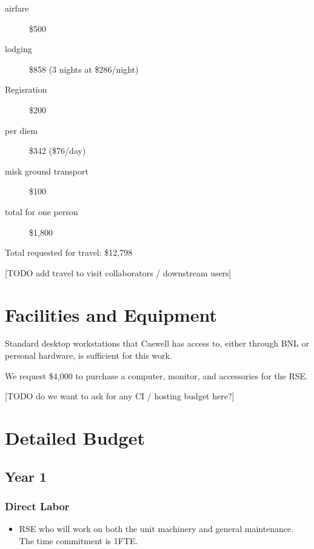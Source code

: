 \documentclass[12pt]{article}
\numberwithin{page}{section}
\begin{document}
\begin{description}
\item [airfare] \$500
\item [lodging] \$858 (3 nights at \$286/night)
\item [Regisration] \$200
\item [per diem] \$342 (\$76/day)
\item [misk ground transport] \$100
\item [total for one person] \$1,800
\end{description}


Total requested for travel: \$12,798

[TODO add travel to visit collaborators / downstream users]

\newpage
\section{Facilities and Equipment}
\setcounter{page}{1}

Standard desktop workstations that Caswell has access to, either
through BNL or personal hardware, is sufficient for this work.

We request \$4,000 to purchase a computer, monitor, and accessories
for the RSE.


[TODO do we want to ask for any CI / hosting budget here?]



\newpage
\section{Detailed Budget}
\setcounter{page}{1}
\subsection{Year 1}
\subsubsection{Direct Labor}
\begin{itemize}
\item RSE who will work on both the unit machinery and general
  maintenance.  The time commitment is 1FTE.
\end{itemize}
\end{document}

